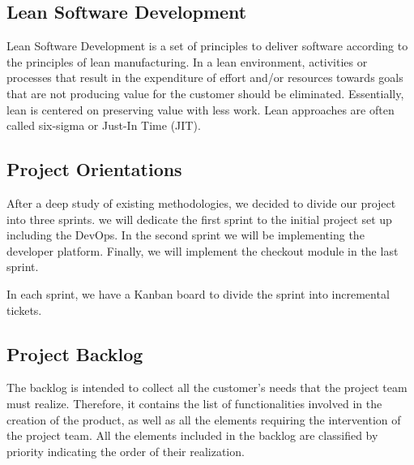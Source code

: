 \begin{spacing}{1.2}
\subsection{Lean Software Development}

Lean Software Development \cite{lean} is a set of principles to deliver software according to the principles of lean manufacturing. In a lean environment, activities or processes that result in the expenditure of effort and/or resources towards goals that are not producing value for the customer should be eliminated. Essentially, lean is centered on preserving value with less work. Lean approaches are often called six-sigma or Just-In Time (JIT).

\subsection{Project Orientations}
After a deep study of existing methodologies, we decided to divide our project into three sprints.
we will dedicate the first sprint to the initial project set up including the DevOps. In the second sprint we will be implementing the developer platform. Finally, we will implement the checkout module in the last sprint.

In each sprint, we have a Kanban board to divide the sprint into incremental tickets.

\subsection{Project Backlog}
The backlog is intended to collect all the customer's needs that the project team must realize. Therefore, it contains the list of functionalities involved in the creation of the product, as well as all the elements requiring the intervention of the project team. All the elements included in the backlog are classified by priority indicating the order of their realization.


\end{spacing}

